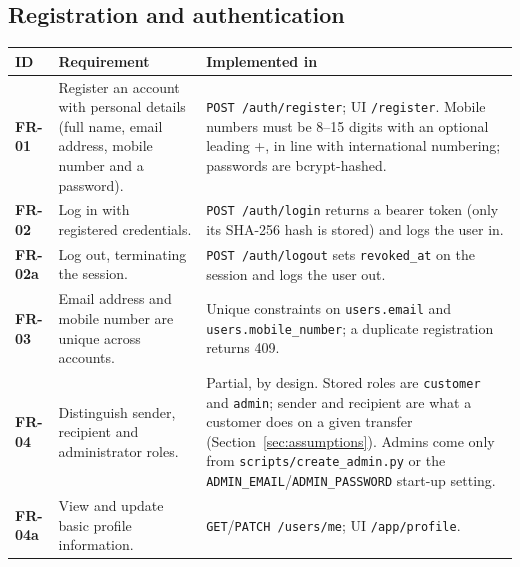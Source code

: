 \documentclass[11pt,a4paper]{article}
\makeatletter
\newcommand{\code}[1]{\texttt{\small #1}}
\newenvironment{frtable}{%
  \rowcolors{2}{white}{rowbg}
  \begin{longtable}{@{}>{\bfseries}l >{\RaggedRight\arraybackslash}p{5.5cm} >{\RaggedRight\arraybackslash}p{8.4cm}@{}}
  \toprule
  \rowcolor{headbg}\textbf{ID} & \textbf{Requirement} & \textbf{Implemented in} \\
  \midrule
  \endhead
  \bottomrule
  \endlastfoot}
 {\end{longtable}}
\makeatother
\begin{document}
\subsection{Registration and authentication}
\begin{frtable}
FR-01  & Register an account with personal details (full name, email address, mobile number and a password).
       & \code{POST /auth/register}; UI \code{/register}. Mobile numbers must be 8--15 digits with an optional leading +, in line with international numbering; passwords are bcrypt-hashed. \\
FR-02  & Log in with registered credentials.
       & \code{POST /auth/login} returns a bearer token (only its SHA-256 hash is stored) and logs the user in. \\
FR-02a & Log out, terminating the session.
       & \code{POST /auth/logout} sets \code{revoked\_at} on the session and logs the user out. \\
FR-03  & Email address and mobile number are unique across accounts.
       & Unique constraints on \code{users.email} and \code{users.mobile\_number}; a duplicate registration returns 409. \\
FR-04  & Distinguish sender, recipient and administrator roles.
       & Partial, by design. Stored roles are \code{customer} and \code{admin}; sender and recipient are what a customer does on a given transfer (Section~\ref{sec:assumptions}). Admins come only from \code{scripts/create\_admin.py} or the \code{ADMIN\_EMAIL}/\code{ADMIN\_PASSWORD} start-up setting. \\
FR-04a & View and update basic profile information.
       & \code{GET}/\code{PATCH /users/me}; UI \code{/app/profile}. \\
\end{frtable}
\end{document}
